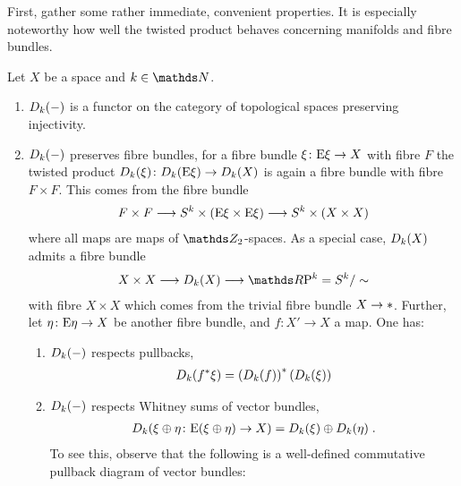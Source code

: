 First, gather some rather immediate, convenient properties. It is
especially noteworthy how well the twisted product behaves concerning
manifolds and fibre bundles.
\begin{Rem}\label{rem:twistedprodproperties}
  Let $X$ be a space and $k\in\Nat$.
  \begin{enumerate}
  \item $D_{k}({-})$ is a functor on the category of
    topological spaces preserving injectivity.
  \item\label{item:twistedprodfibrebdl}
    $D_{k}({-})$ preserves fibre bundles,
    \idest for a fibre bundle $\xi\colon\mathrm{E}\xi\to X$ with fibre $F$
    the twisted product $D_{k}({\xi})\colon
    D_{k}({\mathrm{E}\xi})\to D_{k}({X})$
    is again a fibre bundle with fibre $F\times F$.
    This comes from the fibre bundle
    \begin{gather*}
      F\times F
      \longrightarrow S^{k}\times(\mathrm{E}\xi\times \mathrm{E}\xi)
      \longrightarrow S^{k}\times(X\times X)
    \end{gather*}
    where all maps are maps of $\Zmod2$-spaces.
    As a special case, $D_{k}({X})$ admits a fibre bundle
    \begin{gather}\label{eq:twistedprodrpnfibrebdl}
      X\times X
      \longto \Twistedprod{k}{X}
      \longto \RP k = \Sphere k/\sim
    \end{gather}
    with fibre $X\times X$ which comes from the trivial fibre bundle
    $X\to*$.
    Further, let $\eta\colon\mathrm{E}\eta\to X$ be
    another fibre bundle, and $f\colon X'\to X$ a map.
    One has:
    \begin{enumerate}
    \item\label{item:twistedprod:preservespb}
      $D_{k}({-})$ respects pullbacks, \idest
      \begin{gather*}
        D_{k}({{f}^* \xi})
        = {\left(D_{k}({f})\right)}^*
        \left(D_{k}({\xi})\right)
      \end{gather*}
    \item $D_{k}({-})$ respects Whitney sums of vector
      bundles, \idest 
      \begin{gather*}
        D_{k}({\xi\oplus\eta\colon \mathrm{E}(\xi\oplus\eta)\to X})
        = D_{k}({\xi})\oplus D_{k}({\eta})
        \;.
      \end{gather*}
      To see this, observe that the following is a well-defined
      commutative pullback diagram of vector bundles:

\end{enumerate}
\end{enumerate}
\end{Rem}
